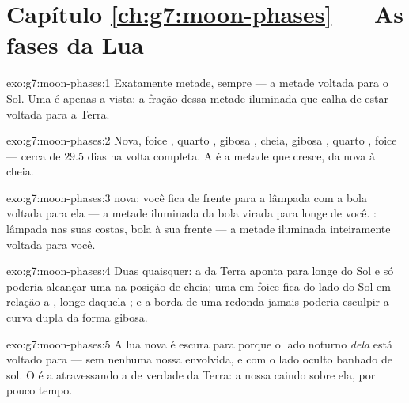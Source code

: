 \section*{Capítulo \ref{ch:g7:moon-phases} --- As fases da Lua}

\begin{solution}{exo:g7:moon-phases:1}
Exatamente metade, sempre --- a metade voltada para o Sol. Uma  é
apenas a vista: a fração dessa metade iluminada que calha de estar
voltada para a Terra.
\end{solution}

\begin{solution}{exo:g7:moon-phases:2}
Nova, foice , quarto , gibosa , cheia,
gibosa , quarto , foice  --- cerca de
$29.5$ dias na volta completa. A  é a metade que cresce, da
nova à cheia.
\end{solution}

\begin{solution}{exo:g7:moon-phases:3}
 nova: você fica de frente para a lâmpada com a bola voltada para
ela --- a metade iluminada da bola virada para longe de você. : lâmpada nas suas costas, bola à sua frente --- a metade
iluminada inteiramente voltada para você.
\end{solution}

\begin{solution}{exo:g7:moon-phases:4}
Duas quaisquer: a  da Terra aponta para longe do Sol e só
poderia alcançar uma  na posição de cheia; uma  em foice fica
do lado do Sol em relação a , longe daquela ; e a borda de
uma  redonda jamais poderia esculpir a curva dupla da forma
gibosa.
\end{solution}

\begin{solution}{exo:g7:moon-phases:5}
A lua nova é escura para  porque o lado noturno \emph{dela} está
voltado para  --- sem nenhuma  nossa envolvida, e com o
lado oculto banhado de sol. O  é a 
atravessando a  de verdade da Terra: a nossa  caindo sobre
ela, por pouco tempo.
\end{solution}

